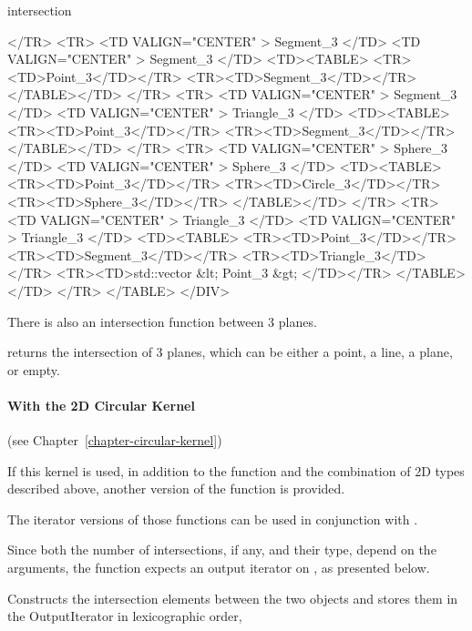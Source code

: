 \begin{ccRefFunction}{intersection}
\begin{ccHtmlOnly}
</TR>
<TR>
    <TD VALIGN="CENTER" > Segment_3 </TD>
    <TD VALIGN="CENTER" > Segment_3 </TD>
    <TD><TABLE>
	<TR><TD>Point_3</TD></TR>
	<TR><TD>Segment_3</TD></TR>
        </TABLE></TD>
</TR>
<TR>
    <TD VALIGN="CENTER" > Segment_3 </TD>
    <TD VALIGN="CENTER" > Triangle_3 </TD>
    <TD><TABLE>
	<TR><TD>Point_3</TD></TR>
	<TR><TD>Segment_3</TD></TR>
        </TABLE></TD>
</TR>
<TR>
    <TD VALIGN="CENTER" > Sphere_3 </TD>
    <TD VALIGN="CENTER" > Sphere_3 </TD>
    <TD><TABLE>
	<TR><TD>Point_3</TD></TR>
	<TR><TD>Circle_3</TD></TR>
	<TR><TD>Sphere_3</TD></TR>
        </TABLE></TD>
</TR>
<TR>
    <TD VALIGN="CENTER" > Triangle_3 </TD>
    <TD VALIGN="CENTER" > Triangle_3 </TD>
    <TD><TABLE>
	<TR><TD>Point_3</TD></TR>
	<TR><TD>Segment_3</TD></TR>
	<TR><TD>Triangle_3</TD></TR>
	<TR><TD>std::vector &lt; Point_3  &gt; </TD></TR>
        </TABLE></TD>
</TR>
</TABLE>
</DIV>
\end{ccHtmlOnly}

There is also an intersection function between 3 planes.

{returns the intersection of 3 planes, which can be either a point, a line,
a plane, or empty.}

\paragraph{With the 2D Circular Kernel} (see Chapter~\ref{chapter-circular-kernel}) 


If this kernel is used, in addition to the function and the
combination of 2D types described above, another version of the function
is provided.

The iterator versions of those functions can be used in conjunction
with .

Since both the number of intersections, if any, and their type, depend
on the arguments, the function expects an output iterator on
, as
presented below.

{Constructs the intersection elements between the
two objects and stores them in the OutputIterator in
lexicographic order,}


\end{ccRefFunction}
